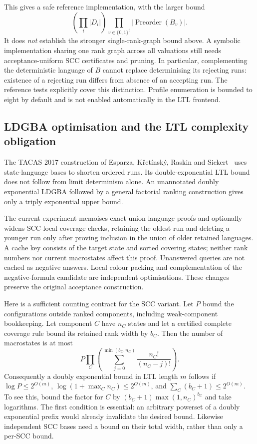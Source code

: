 This gives a safe reference implementation, with the larger bound
\[
 \left(\prod_i|D_i|\right)
 \prod_{v\in\{0,1\}^t}|\operatorname{Preorder}(B_v)|.
\]
It does \emph{not} establish the stronger single-rank-graph bound above.
A symbolic implementation sharing one rank graph across all valuations
still needs acceptance-uniform SCC certificates and pruning. In
particular, complementing the deterministic language of $B$ cannot
replace determinising its rejecting runs: existence of a rejecting run
differs from absence of an accepting run. The reference tests explicitly
cover this distinction. Profile enumeration is bounded to eight by
default and is not enabled automatically in the LTL frontend.

\subsection{LDGBA optimisation and the LTL complexity obligation}
The TACAS 2017 construction of Esparza, K\v{r}et\'{i}nsk\'{y}, Raskin
and Sickert~\cite{EKRS17} uses state-language bases to shorten ordered runs. Its
double-exponential LTL bound does not follow from limit determinism alone.
An unannotated doubly exponential LDGBA followed by a general factorial
ranking construction gives only a triply exponential upper bound.

The current experiment memoises exact union-language proofs and optionally
widens SCC-local coverage checks, retaining the oldest run and deleting a
younger run only after proving inclusion in the union of older retained
languages. A cache key consists of the target state and sorted covering
states; neither rank numbers nor current macrostates affect this proof.
Unanswered queries are not cached as negative answers. Local colour packing
and complementation of the negative-formula candidate are independent
optimisations. These changes preserve the original acceptance construction.

Here is a sufficient counting contract for the SCC variant. Let $P$ bound
the configurations outside ranked components, including weak-component
bookkeeping. Let component $C$ have $n_C$ states and let a certified complete
coverage rule bound its retained rank width by $b_C$. Then the number of
macrostates is at most
\[
 P\prod_C\left(\sum_{j=0}^{\min(b_C,n_C)}
                         \frac{n_C!}{(n_C-j)!}\right).
\]
Consequently a doubly exponential bound in LTL length $m$ follows if
$\log P\leq 2^{O(m)}$, $\log(1+\max_C n_C)\leq 2^{O(m)}$, and
$\sum_C(b_C+1)\leq 2^{O(m)}$. To see this, bound the factor for $C$ by
$(b_C+1)\max(1,n_C)^{b_C}$ and take logarithms. The first condition is
essential: an arbitrary powerset of a doubly exponential prefix would
already invalidate the desired bound. Likewise independent SCC bases need
a bound on their total width, rather than only a per-SCC bound.

